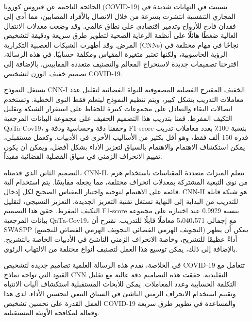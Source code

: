 \begin{arab}[utf]
\chapter*{} %
\label{araSummery} 
الجائحة الناجمة عن فيروس كورونا (COVID-19) تسببت في التهابات شديدة في المجاري التنفسية انتشرت بسرعة من خلال الاتصال بالأفراد المصابين، مما أدى إلى فقدان فادح للأرواح وتدمير اقتصادي على نطاق عالمي. وقد وضعت معدلات الانتقال العالية ضغطًا هائلًا على أنظمة الرعاية الصحية لتطوير طرق سريعة ودقيقة لتشخيص المرض. وقد أظهرت الشبكات العصبية التكرارية (CNNs) نجاحًا في مهام مختلفة في الرؤية الحاسوبية، ولكنها تعتبر متغيرة المقياس ومكلفة حسابيًا. في هذه الرسالة، اقترحنا تصميمات جديدة لاستخراج المعالم والتصنيف متعددة المقاييس، بالإضافة إلى تصميم خفيف الوزن لتشخيص COVID-19.

يستغل النموذج CNN-I الخفيف المقترح الفصلية المصفوفية للنواة الفضائية لتقليل عدد معاملات التدريب بشكل كبير، ويتم تنظيم النموذج ليتعلم فقط النوى الخطية. وتستخدم اتصالات البقاء والتعادل على مجموعات كبيرة للحفاظ على استقرار الشبكة وتقليل التكيف المفرط. قمنا بتدريب هذا التصميم الخفيف على مجموعة البيانات المرجعية QaTa-Cov19، وحققنا دقة وحساسية ودقة و F1-score بنسبة 100٪ بعدد معاملات تدريب قدره 150 ألف فقط، وهو أقل بكثير من الأساليب الأخرى في الأدبيات. وكعمل مستقبلي، يمكن استكشاف الاهتمام والاهتمام بالسياق لتعزيز الأداء بشكل أفضل، ويمكن أن يكون تقييم الانحراف الزمني في سياق الفصلية الفضائية مفيداً.

التصميم الثاني الذي قدمناه، CNN-II، يتعلم الميزات متعددة المقياسات باستخدام هرم من نوى التبعية المشتركة بمعدلات انحراف مختلفة، مما يجعله مقايسًا. يتم استخدام آلية قائمة على الاهتمام لتوجيه واختيار المقياس الصحيح لكل إدخال. CNN-II هو شبكة قابلة للتدريب من البداية إلى النهاية تستغل تقنية التعزيز الجديدة، التعزيز النسيجي، لتقليل التكيف المفرط. حقق هذا التصميم F1-score بنسبة 0.9929 عند اختباره على مجموعة بيانات المرجعية QaTa-Cov19، مع إجمالي 5،040،571 معاملًا قابلًا للتدريب. نقترح أن SWASPP (التجويف الهرمي الفضائي التجويف الهرمي الفضائي للتجميع) يمكن أن يظهر أداءً عظيمًا للتشريح، وخاصة الانحراف الزمني الناشئ في الأدبيات الخاصة بالتشريح. بالإضافة إلى ذلك، يمكن توسيع هذا العمل لتصنيف أنواع مختلفة من الالتهاب الرئوي.

في الخلاصة، تقدم هذه الرسالة العلمية تصاميم جديدة لتشخيص COVID-19 تتعامل مع القيود التي تواجه نماذج CNN التقليدية. حققت هذه التصاميم دقة عالية مع تقليل التكلفة الحسابية وعدد المعاملات. يمكن للأبحاث المستقبلية استكشاف آليات الانتباه وتقييم استخدام الانحراف الزمني الناشئ في السياق التبعي لتحسين الأداء. لدى هذا العمل القدرة على تحسين تشخيص COVID-19 والمساعدة في تطوير طرق سريعة وفعالة لمكافحة الأوبئة المستقبلية.


\end{arab}
